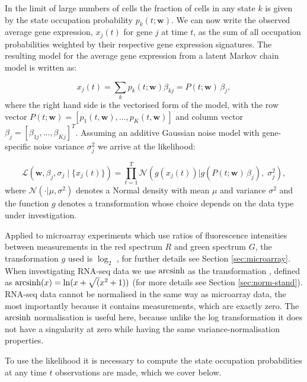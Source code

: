 In the limit of large numbers of cells the fraction of cells in any state $k$ is given by the state occupation probability $p_k(t;\mathbf{w})$. We can now write the observed average gene expression, $x_j(t)$ for gene $j$ at time $t$, as the sum of all occupation probabilities weighted by their respective gene expression signatures. The resulting model for the average gene expression from a latent Markov chain model is written as:

\begin{equation}
  x_j(t) = \sum_k p_k(t;\mathbf{w})\beta_{kj} = P(t;\mathbf{w}) \, \beta_j,
  \label{eq:model}
\end{equation}
where the right hand side is the vectorised form of the model, with the row vector $P(t;\mathbf{w}) = [p_1(t,\mathbf{w}), \ldots , p_K(t,\mathbf{w})]$ and column vector $\beta_j = [\beta_{1j}, \ldots , \beta_{Kj}]^T$. Assuming an additive Gaussian noise model with gene-specific noise variance $\sigma_j^2 $ we arrive at the likelihood:

\begin{equation}
  \label{eq:likelihood}
    \mathcal{L} \left(\mathbf{w}, \beta_j, \sigma_j \;|\; \lbrace x_j(t)\rbrace\right) =
\prod_{t=1}^T \mathcal{N}\left(g(x_j(t)) | g\left(P(t; \mathbf{w})\,\beta_j\right),\; \sigma_j^2 \right),
\end{equation}
where $\mathcal{N}(\cdot | \mu,\sigma^2)$ denotes a Normal density with mean $\mu$ and variance $\sigma^2$ and the function $g$ denotes a transformation whose choice depends on the data type under investigation.

Applied to microarray experiments which use ratios of fluorescence intensities between measurements in the red spectrum $R$ and green spectrum $G$, the transformation $g$ used is $\log_2$ \citep{Dudoit:2002va}, for further details see Section \ref{sec:microarray}. When investigating RNA-seq data we use $\operatorname{arcsinh}$ as the transformation \citep{Hoffman:2012gn,Johnson:1949uq}, defined as $\operatorname{arcsinh}(x) = \ln(x + \sqrt(x^2 +1))$ (for more details see Section \ref{sec:norm-stand}). RNA-seq data cannot be normalised in the same way as microarray data, the most importantly because it contains measurements, which are exactly zero. The $\operatorname{arcsinh}$ normalisation is useful here, because unlike the log transformation it does not have a singularity at zero while having the same variance-normalisation properties.

To use the likelihood it is necessary to compute the state occupation probabilities at any time $t$ observations are made, which we cover below.

